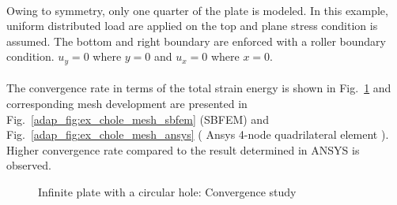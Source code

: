 \paragraph{}
Owing to symmetry, only one quarter of the plate is modeled.
In this example, uniform distributed load are applied on the top and plane stress condition is assumed.
The bottom and right boundary are enforced with a roller boundary condition. $u_y=0$ where $y=0$ and $u_x=0$ where $x=0$.

\paragraph{}
The convergence rate in terms of the total strain energy is shown in Fig.~\ref{adap_fig:ex_chole_conv} and corresponding mesh development are presented in Fig.~\ref{adap_fig:ex_chole_mesh_sbfem} (SBFEM) and Fig.~\ref{adap_fig:ex_chole_mesh_ansys} ( Ansys 4-node quadrilateral element ).
Higher convergence rate compared to the result determined in ANSYS is observed.
\begin{figure}[h!]
    \centering
    \caption{Infinite plate with a circular hole: Convergence study}
    \label{adap_fig:ex_chole_conv}
\end{figure}

